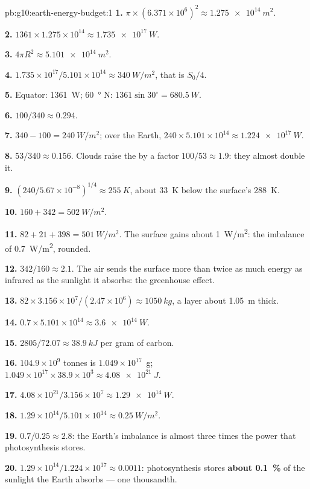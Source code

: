 \begin{solution}{pb:g10:earth-energy-budget:1}
\textbf{1.} $\pi \times (6.371\times10^6)^2 \approx \qty{1.275e14}{m^2}$.

\textbf{2.} $1361 \times 1.275\times10^{14} \approx \qty{1.735e17}{W}$.

\textbf{3.} $4\pi R^2 \approx \qty{5.101e14}{m^2}$.

\textbf{4.} $1.735\times10^{17}/5.101\times10^{14} \approx \qty{340}{W/m^2}$,
that is $S_0/4$.

\textbf{5.} Equator: \qty{1361}{W}; \qty{60}{\degree} N: $1361 \sin
30^\circ = \qty{680.5}{W}$.

\textbf{6.} $100/340 \approx 0.294$.

\textbf{7.} $340 - 100 = \qty{240}{W/m^2}$; over the Earth, $240 \times
5.101\times10^{14} \approx \qty{1.224e17}{W}$.

\textbf{8.} $53/340 \approx 0.156$. Clouds raise the  by a factor
$100/53 \approx 1.9$: they almost double it.

\textbf{9.} $(240/5.67\times10^{-8})^{1/4} \approx \qty{255}{K}$, about
\qty{33}{K} below the surface's \qty{288}{K}.

\textbf{10.} $160 + 342 = \qty{502}{W/m^2}$.

\textbf{11.} $82 + 21 + 398 = \qty{501}{W/m^2}$. The surface gains about
\qty{1}{W/m^2}: the imbalance of \qty{0.7}{W/m^2}, rounded.

\textbf{12.} $342/160 \approx 2.1$. The air sends the surface more than
twice as much energy as infrared as the sunlight it absorbs: the greenhouse
effect.

\textbf{13.} $82 \times 3.156\times10^7/(2.47\times10^6) \approx
\qty{1050}{kg}$, a layer about \qty{1.05}{m} thick.

\textbf{14.} $0.7 \times 5.101\times10^{14} \approx \qty{3.6e14}{W}$.

\textbf{15.} $2805/72.07 \approx \qty{38.9}{kJ}$ per gram of carbon.

\textbf{16.} $104.9\times10^9$ tonnes is $1.049\times10^{17}$~g;
$1.049\times10^{17} \times 38.9\times10^3 \approx \qty{4.08e21}{J}$.

\textbf{17.} $4.08\times10^{21}/3.156\times10^7 \approx \qty{1.29e14}{W}$.

\textbf{18.} $1.29\times10^{14}/5.101\times10^{14} \approx
\qty{0.25}{W/m^2}$.

\textbf{19.} $0.7/0.25 \approx 2.8$: the Earth's imbalance is almost three
times the power that photosynthesis stores.

\textbf{20.} $1.29\times10^{14}/1.224\times10^{17} \approx 0.0011$:
photosynthesis stores \textbf{about \qty{0.1}{\percent}} of the sunlight
the Earth absorbs --- one thousandth.
\end{solution}
